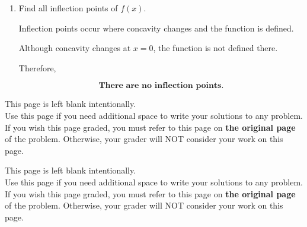 \documentclass[11pt]{article}
\begin{document}
\begin{enumerate}
\begin{enumerate}
{    \vspace{0.3cm}

    Concave down when $f''(x)<0$:

    \[
    (-\infty,0)
    \]

    Concave up when $f''(x)>0$:

    \[
    (0,\infty)
    \]

    }
    \item Find all inflection points of $f(x)$.

 {\color{blue}

    Inflection points occur where concavity changes and the function is defined.

    Although concavity changes at $x=0$, the function is not defined there.

    Therefore,

    \[
    \textbf{There are no inflection points.}
    \]

    }
\end{enumerate}





\newpage

This page is left blank intentionally.\\

Use this page if you need additional space to write your solutions to any problem. \\

If you wish this page graded, you must refer to this page on \textbf{the original page} of the problem. Otherwise, your grader will NOT consider your work on this page.

\newpage

This page is left blank intentionally.\\

Use this page if you need additional space to write your solutions to any problem. \\

If you wish this page graded, you must refer to this page on \textbf{the original page} of the problem. Otherwise, your grader will NOT consider your work on this page.

\end{enumerate}
\end{document}
